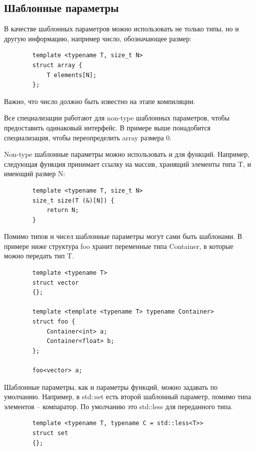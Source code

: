 \documentclass[12pt, a4paper]{article}
\begin{document}
	\subsection{Шаблонные параметры}\par В качестве шаблонных параметров можно использовать не только типы, но и другую информацию, например число, обозначающее размер:
	\begin{verbatim}
		template <typename T, size_t N>
		struct array {
			T elements[N];
		};
	\end{verbatim}
	Важно, что число должно быть известно на этапе компиляции.
	\\\par Все специализации работают для non-type шаблонных параметров, чтобы предоставить одинаковый интерфейс. В примере выше понадобится специализация, чтобы переопределить array размера 0.
	\par Non-type шаблонные параметры можно использовать и для функций. Например, следующая функция принимает ссылку на массив, хранящий элементы типа T, и имеющий размер N:
	\begin{verbatim}
		template <typename T, size_t N>
		size_t size(T (&)[N]) {
			return N;
		}
	\end{verbatim}
	\par Помимо типов и чисел шаблонные параметры могут сами быть шаблонами. В примере ниже структура foo хранит переменные типа Container, в которые можно передать тип T.
	\begin{verbatim}
		template <typename T>
		struct vector 
		{};
		
		template <template <typename T> typename Container>
		struct foo {
			Container<int> a;
			Container<float> b;
		};
		
		foo<vector> a;
	\end{verbatim}
	\par Шаблонные параметры, как и параметры функций, можно задавать по умолчанию. Например, в std::set есть второй шаблонный параметр, помимо типа элементов -- компаратор. По умолчанию это std::less для переданного типа.
	\begin{verbatim}
		template <typename T, typename C = std::less<T>>
		struct set
		{};
	\end{verbatim}
\end{document}
